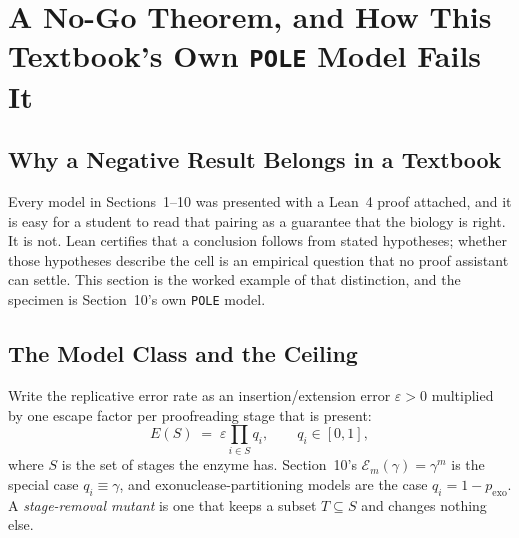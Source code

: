 \documentclass[11pt,a4paper]{article}
\theoremstyle{definition}
\theoremstyle{remark}
\begin{document}
\section{A No-Go Theorem, and How This Textbook's Own \texttt{POLE} Model Fails It}\label{sec:nogo}

\subsection{Why a Negative Result Belongs in a Textbook}
Every model in Sections~1--10 was presented with a Lean~4 proof attached, and it is easy for a student to read that pairing as a guarantee that the biology is right. It is not. Lean certifies that a conclusion follows from stated hypotheses; whether those hypotheses describe the cell is an empirical question that no proof assistant can settle. This section is the worked example of that distinction, and the specimen is Section~10's own \texttt{POLE} model.

\subsection{The Model Class and the Ceiling}
Write the replicative error rate as an insertion/extension error $\varepsilon > 0$ multiplied by one escape factor per proofreading stage that is present:
\begin{equation}\label{eq:modelclass}
  E(S) \;=\; \varepsilon \prod_{i \in S} q_i, \qquad q_i \in [0,1],
\end{equation}
where $S$ is the set of stages the enzyme has. Section~10's $\mathcal{E}_m(\gamma) = \gamma^m$ is the special case $q_i \equiv \gamma$, and exonuclease-partitioning models are the case $q_i = 1 - p_{\mathrm{exo}}$. A \emph{stage-removal mutant} is one that keeps a subset $T \subseteq S$ and changes nothing else.
\end{document}
